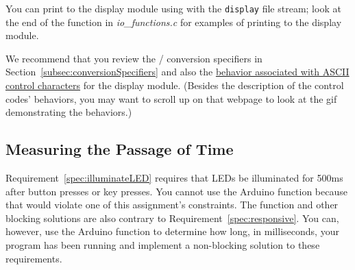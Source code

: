 You can print to the display module using  with the \lstinline{display} file stream;
look at the end of the  function in \textit{io\_functions.c} for examples of printing to the display module.

We recommend that you review the / conversion specifiers in Section~\ref{subsec:conversionSpecifiers}
and also the \href{https://cow-pi.readthedocs.io/en/latest/CowPi_stdio/lcd_character.html#ascii-control-characters}{behavior associated with ASCII control characters} for the display module.
(Besides the description of the control codes' behaviors, you may want to scroll up on that webpage to look at the gif demonstrating the behaviors.)


\subsection{Measuring the Passage of Time}

Requirement~\ref{spec:illuminateLED} requires that LEDs be illuminated for 500ms after button presses or key presses.
You cannot use the Arduino  function because that would violate one of this assignment's constraints.
The  function and other blocking solutions are also contrary to Requirement~\ref{spec:responsive}.
You can, however, use the Arduino  function to determine how long, in milliseconds, your program has been running and implement a non-blocking solution to these requirements.




